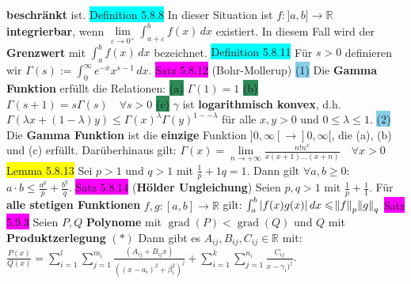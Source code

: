 \documentclass[landscape, 10pt]{article}
\newcommand{\R}{\mathbb{R}}
\begin{document}
\begin{multicols}{3}
                \textbf{beschränkt} ist. 
\colorbox{cyan}{Definition 5.8.8} In dieser Situation ist 
                \textcolor{NavyBlue}{$f:]a,b]\longrightarrow\R$} 
                \textbf{integrierbar}, wenn 
                \textcolor{NavyBlue}{
                $\lim\limits_{\varepsilon\to0^+}\int_{a+\varepsilon}^bf(x)\,dx$} existiert.
                In diesem 
         Fall wird der \textbf{Grenzwert} mit 
                \textcolor{NavyBlue}{$\int_a^bf(x)\,dx$} bezeichnet. 
\colorbox{cyan}{Definition 5.8.11} Für \textcolor{NavyBlue}{$s>0$} definieren wir 
                \textcolor{NavyBlue}{$\Gamma(s):=\int_0^\infty e^{-x}x^{s-1}\,dx$}. 
\colorbox{magenta}{Satz 5.8.12} (Bohr-Mollerup) \colorbox{SkyBlue}{(1)} 
                Die \textbf{Gamma Funktion} erfüllt die Relationen: 
         \colorbox{SeaGreen}{(a)}
                \textcolor{NavyBlue}{$\Gamma(1)=1$} \qquad
                \colorbox{SeaGreen}{(b)} 
                \textcolor{NavyBlue}{$\Gamma(s+1)=s\Gamma(s)\quad\forall s>0$} 
         \colorbox{SeaGreen}{(c)} \textcolor{NavyBlue}{$\gamma$} ist 
                \textbf{logarithmisch konvex}, d.h. 
                \textcolor{NavyBlue}{$\Gamma(\lambda x+(1-\lambda)y)
                \leqslant\Gamma(x)^\lambda\Gamma(y)^{1--\lambda}$}
                für alle \textcolor{NavyBlue}{$x,y>0$} und 
                \textcolor{NavyBlue}{$0\leqslant\lambda\leqslant1$}.
         \colorbox{SkyBlue}{(2)} Die \textbf{Gamma Funktion} ist die 
                \textbf{einzige} Funktion 
                \textcolor{NavyBlue}{$]0,\infty[\longrightarrow]0,\infty[$},
                die (a), (b) und (c) erfüllt. 
         Darüberhinaus gilt: 
                \textcolor{NavyBlue}{$\Gamma(x)
                =\lim\limits_{n\to+\infty}\frac{n!n^x}{x(x+1)...(x+n)}\quad
                \forall x>0$}
\colorbox{yellow}{Lemma 5.8.13} Sei \textcolor{NavyBlue}{$p>1$} und 
                \textcolor{NavyBlue}{$q>1$} mit 
                \textcolor{NavyBlue}{$\frac{1}{p}+{1}{q}=1$}. Dann gilt 
                \textcolor{NavyBlue}{$\forall a,b\geqslant0$}: 
                \textcolor{NavyBlue}{$a\cdot b\leqslant\frac{a^p}{p}+\frac{b^q}{q}$}.
\colorbox{magenta}{Satz 5.8.14} (\textbf{Hölder Ungleichung}) Seien 
                \textcolor{NavyBlue}{$p,q>1$} mit 
                \textcolor{NavyBlue}{$\frac{1}{p}+\frac{1}{1}$}. Für 
                \textbf{alle stetigen Funktionen} 
                \textcolor{NavyBlue}{$f,g:[a,b]\longrightarrow\R$} gilt: 
         \textcolor{NavyBlue}{$\int_a^b|f(x)g(x)|\,dx\leqslant\norm{f}_p\norm{g}_q$}
\colorbox{magenta}{Satz 5.9.3} Seien \textcolor{NavyBlue}{$P,Q$} \textbf{Polynome} mit 
                \textcolor{NavyBlue}{$\operatorname{grad}(P)<\operatorname{grad}(Q)$} und 
                \textcolor{NavyBlue}{$Q$}
                mit \textbf{Produktzerlegung} $(*)$ Dann gibt es 
         \textcolor{NavyBlue}{$A_{ij},B_{ij},C_{ij}\in\R$} mit: 
                \textcolor{NavyBlue}{$\frac{P(x)}{Q(x)}
                =\sum_{i=1}^l\sum_{j=1}^{m_i}
                \frac{(A_{ij}+B_{ij}x)}{((x-a_i)^2+\beta_i^2)^j}
                +\sum_{i=1}^k\sum_{j=1}^{n_i}\frac{C_{ij}}{x-\gamma_i)^j}$}.



\end{multicols}
\end{document}
